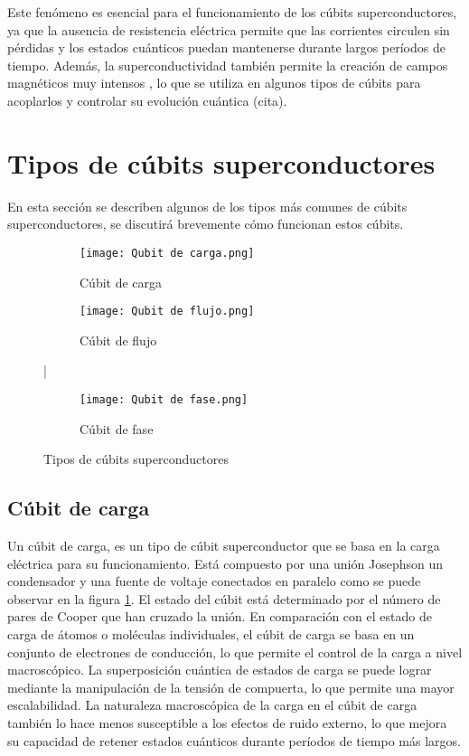 \documentclass[12pt]{article}
\begin{document}
Este fenómeno es esencial para el funcionamiento de los cúbits superconductores, ya que la ausencia de resistencia eléctrica permite que las corrientes circulen sin pérdidas y los estados cuánticos puedan mantenerse durante largos períodos de tiempo. Además, la superconductividad también permite la creación de campos magnéticos muy intensos \citep{tyler_measurements_2004}, lo que se utiliza en algunos tipos de cúbits para acoplarlos y controlar su evolución cuántica (cita).

\section{Tipos de cúbits superconductores}
En esta sección se describen algunos de los tipos más comunes de cúbits superconductores, se discutirá brevemente cómo funcionan estos cúbits.

\begin{figure}[ht]
  \centering
  \begin{subfigure}[b]{0.25\textwidth}
    \texttt{[image: Qubit de carga.png]}
    \caption{Cúbit de carga }
    \label{fig:Cúbit de carga}
  \end{subfigure}
  \begin{subfigure}[b]{0.25\textwidth}
    \texttt{[image: Qubit de flujo.png]}
    \caption{Cúbit de flujo}
    \label{fig:Cúbit de flujo}
  \end{subfigure}
  |\begin{subfigure}[b]{0.25\textwidth}
    \texttt{[image: Qubit de fase.png]}
    \caption{Cúbit de fase}
    \label{fig:Cúbit de fase}
  \end{subfigure}
  \caption{Tipos de cúbits superconductores \citep{gu_microwave_2017} }
\end{figure}


\subsection{Cúbit de carga}
Un cúbit de carga, es un tipo de cúbit superconductor que se basa en la carga eléctrica para su funcionamiento. Está compuesto por una unión Josephson un condensador y una fuente de voltaje conectados en paralelo como se puede observar en la figura \ref{fig:Cúbit de carga}.
El estado del cúbit está determinado por el número de pares de Cooper que han cruzado la unión. En comparación con el estado de carga de átomos o moléculas individuales, el cúbit de carga se basa en un conjunto de electrones de conducción, lo que permite el control de la carga a nivel macroscópico. La superposición cuántica de estados de carga se puede lograr mediante la manipulación de la tensión de compuerta, lo que permite una mayor escalabilidad. La naturaleza macroscópica de la carga en el cúbit de carga también lo hace menos susceptible a los efectos de ruido externo, lo que mejora su capacidad de retener estados cuánticos durante períodos de tiempo más largos.
\end{document}
